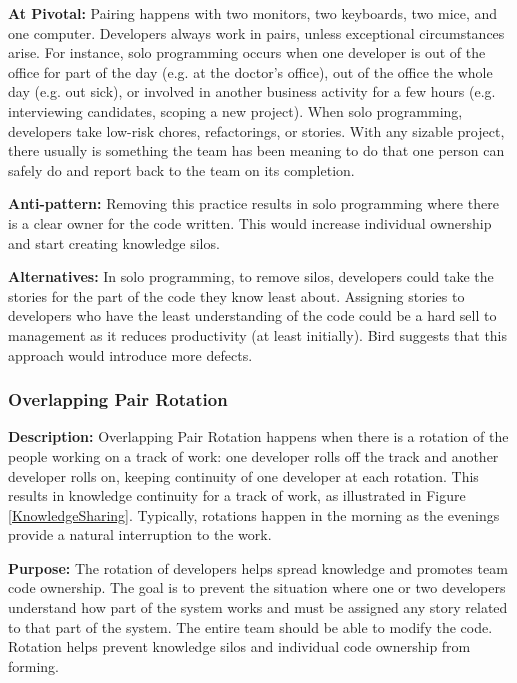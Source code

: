 \textbf{At Pivotal:} Pairing happens with two monitors, two keyboards, two mice, and one computer. Developers always work in pairs, unless exceptional circumstances arise. For instance, solo programming occurs when one developer is out of the office for part of the day (e.g. at the doctor's office), out of the office the whole day (e.g. out sick), or involved in another business activity for a few hours (e.g. interviewing candidates, scoping a new project). When solo programming, developers take low-risk chores, refactorings, or stories. With any sizable project, there usually is something the team has been meaning to do that one person can safely do and report back to the team on its completion. 

\textbf{Anti-pattern:} Removing this practice results in solo programming where there is a clear owner for the code written. This would increase individual ownership and start creating knowledge silos. 

\textbf{Alternatives:} In solo programming, to remove silos, developers could take the stories for the part of the code they know least about. Assigning stories to developers who have the least understanding of the code could be a hard sell to management as it reduces productivity (at least initially). Bird \cite{BirdDontTouchMyCode} suggests that this approach would introduce more defects. 

\subsubsection{Overlapping Pair Rotation}
\label{OverlappingPairRotationSection}
\textbf{Description:} Overlapping Pair Rotation happens when there is a rotation of the people working on a track of work: one developer rolls off the track and another developer rolls on, keeping continuity of one developer at each rotation. This results in knowledge continuity for a track of work, as illustrated in Figure \ref{KnowledgeSharing}. Typically, rotations happen in the morning as the evenings provide a natural interruption to the work. 

\textbf{Purpose:} The rotation of developers helps spread knowledge and promotes team code ownership. The goal is to prevent the situation where one or two developers understand how  part of the system works and must be assigned any story related to that part of the system. The entire team should be able to modify the code. Rotation helps prevent knowledge silos and individual code ownership from forming. 


